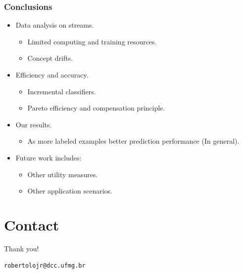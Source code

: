 \documentclass[14pt]{beamer}
\begin{document}
\begin{frame}\frametitle{Conclusions}

\begin{itemize}
\item Data analysis on streams.
\begin{itemize}
\item Limited computing and training resources.
\item Concept drifts.
\end{itemize}
\item Efficiency and accuracy.
\begin{itemize}
\item Incremental classifiers.
\item Pareto efficiency and compensation principle.
\end{itemize}
\item Our results.
\begin{itemize}
\item As more labeled examples better prediction performance (In general).
\end{itemize}
\item Future work includes:
\begin{itemize}
\item Other utility measures.
\item Other application scenarios.
\end{itemize}
\end{itemize}

\end{frame}

\section{Contact}
\begin{frame}{Thank you!}
\begin{center}
\tt robertolojr@dcc.ufmg.br\\
\end{center}
\end{frame}
\end{document}
